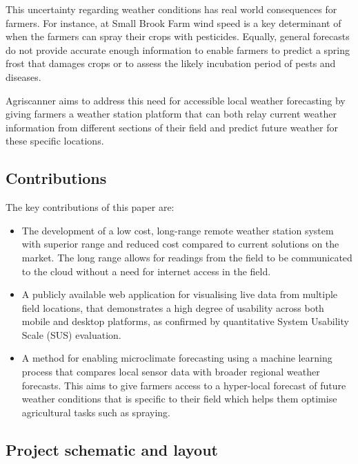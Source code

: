 This uncertainty regarding weather conditions has real world consequences for
farmers. For instance, at Small Brook Farm wind speed is a key determinant of
when the farmers can spray their crops with pesticides. Equally, general
forecasts do not provide accurate enough information to enable farmers to
predict a spring frost that damages crops or to assess the likely incubation
period of pests and diseases.

Agriscanner aims to address this need for accessible local weather forecasting
by giving farmers a weather station platform that can both relay current weather
information from different sections of their field and predict future weather
for these specific locations.

\subsection{Contributions}

The key contributions of this paper are:

\begin{itemize}
    \item The development of a low cost, long-range remote weather station
          system with superior range and reduced cost compared to current
          solutions on the market. The long range allows for readings from the
          field to be communicated to the cloud without a need for internet
          access in the field.
    \item A publicly available web application for visualising live data from
          multiple field locations, that demonstrates a high degree of usability
          across both mobile and desktop platforms, as confirmed by quantitative
          System Usability Scale (SUS) evaluation.
    \item A method for enabling microclimate forecasting using a machine
          learning process that compares local sensor data with broader regional
          weather forecasts. This aims to give farmers access to a hyper-local
          forecast of future weather conditions that is specific to their field
          which helps them optimise agricultural tasks such as spraying.
\end{itemize} 

\subsection{Project schematic and layout}

